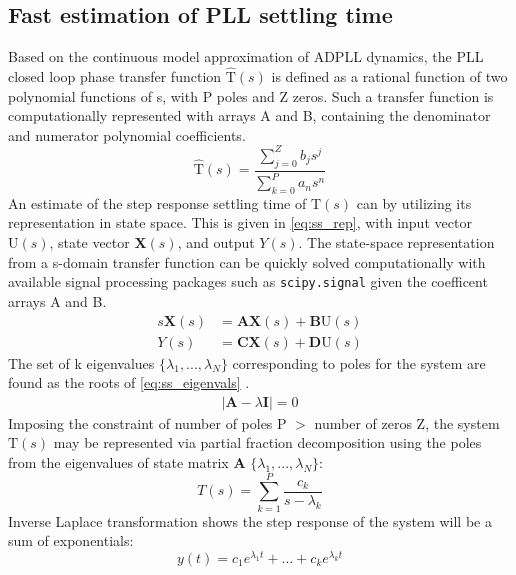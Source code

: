 \subsection{Fast estimation of PLL settling time}
	Based on the continuous model approximation of ADPLL dynamics, the PLL closed loop phase transfer function $\mathrm{\hat{T}}(s)$ is defined as a rational function of two polynomial functions of s, with P poles and Z zeros. Such a transfer function is computationally represented with arrays A and B, containing the denominator and numerator polynomial coefficients.
	\begin{equation}\label{eq:pll_cl_tf}
	\mathrm{\hat{T}}(s) = \frac{\sum_{j=0}^Z b_js^j}{\sum_{k=0}^P a_ns^n}
	\end{equation}
	An estimate of the step response settling time of $\mathrm{T}(s)$ can by utilizing its representation in state space. This is given in \ref{eq:ss_rep}, with input vector $\mathrm{U}(s)$, state vector $\mathbf{X}(s)$, and output $Y(s)$. The state-space representation from a s-domain transfer function can be quickly solved computationally with available signal processing packages such as \texttt{scipy.signal} given the coefficent arrays A and B.
	\begin{align} \label{eq:ss_rep}
		s\mathbf{X}(s) &= \mathbf{AX}(s) +\mathbf{B}\mathrm{U}(s)\\
		Y(s) &= \mathbf{CX}(s) +\mathbf{D}\mathrm{U}(s)
	\end{align}
	The set of k eigenvalues $\{\lambda_1, ... , \lambda_{N}\}$ corresponding to poles for the system are found as the roots of \ref{eq:ss_eigenvals} \cite{brockett_1965}.%
	\begin{align}
		|\mathbf{A} - \lambda \mathbf{I}| = 0\label{eq:ss_eigenvals}%
	\end{align}
	Imposing the constraint of number of poles P $>$ number of zeros Z, the system $\mathrm{T}(s)$ may be represented via partial fraction decomposition using the poles from the eigenvalues of state matrix $\mathbf{A}$ $\{\lambda_1, ... , \lambda_{N}\}$:
	\begin{equation}
		T(s) = \sum_{k=1}^{P} \frac{c_k}{s-\lambda_k}
	\end{equation}
	Inverse Laplace transformation shows the step response of the system will be a sum of exponentials:
	\begin{equation}
		y(t) = c_1e^{\lambda_1t} + ... + c_ke^{\lambda_kt}%
	\end{equation}

